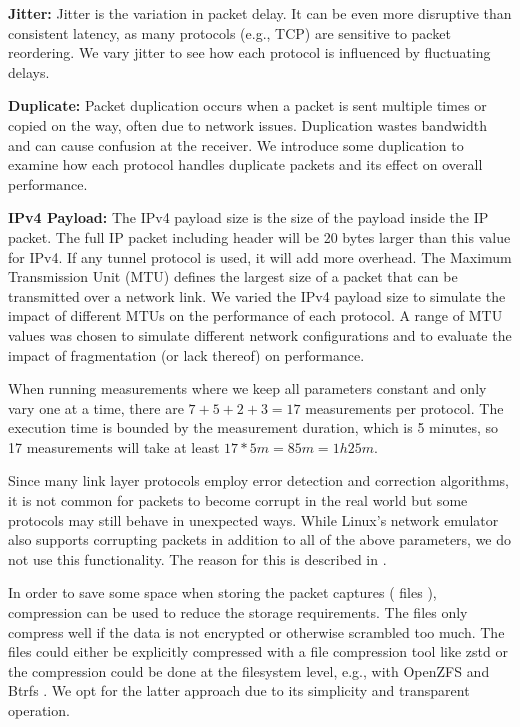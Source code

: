 \noindent\textbf{Jitter:} Jitter is the variation in packet delay.
It can be even more disruptive than consistent latency, as many protocols (e.g., TCP) are sensitive to packet reordering.
We vary jitter to see how each protocol is influenced by fluctuating delays.

\noindent\textbf{Duplicate:} Packet duplication occurs when a packet is sent multiple times or copied on the way, often due to network issues.
Duplication wastes bandwidth and can cause confusion at the receiver.
We introduce some duplication to examine how each protocol handles duplicate packets and its effect on overall performance.

\noindent\textbf{IPv4 Payload:} The IPv4 payload size is the size of the payload inside the IP packet.
The full IP packet including header will be 20 bytes larger than this value for IPv4.
If any tunnel protocol is used, it will add more overhead.
The Maximum Transmission Unit (MTU) defines the largest size of a packet that can be transmitted over a network link.
We varied the IPv4 payload size to simulate the impact of different MTUs on the performance of each protocol.
A range of MTU values was chosen to simulate different network configurations and to evaluate the impact of fragmentation (or lack thereof) on performance.

When running measurements where we keep all parameters constant and only vary one at a time, there are $7 + 5 + 2 + 3 = 17$ measurements per protocol.
The execution time is bounded by the measurement duration, which is 5 minutes, so 17 measurements will take at least $17 * 5 m = 85 m = 1h25m$.

Since many link layer protocols employ error detection and correction algorithms, it is not common for packets to become corrupt in the real world but some protocols may still behave in unexpected ways.
While Linux's network emulator also supports corrupting packets in addition to all of the above parameters, we do not use this functionality.
The reason for this is described in .

In order to save some space when storing the packet captures ( files \cite{ietf-opsawg-pcap-04}), compression can be used to reduce the storage requirements.
The  files only compress well if the data is not encrypted or otherwise scrambled too much.
The files could either be explicitly compressed with a file compression tool like zstd or the compression could be done at the filesystem level, e.g., with OpenZFS \cite{OpenZFS} and Btrfs \cite{Btrfs}.
We opt for the latter approach due to its simplicity and transparent operation.

